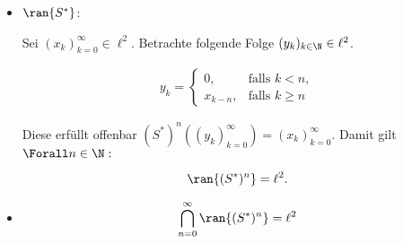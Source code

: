 \begin{solution}
\begin{itemize}

  \item
  $\ran{S^\ast}$:

  Sei $(x_k)_{k=0}^\infty \in \ell^2$.
  Betrachte folgende Folge $(y_k)_{k \in \N} \in \ell^2$.

  \begin{align*}
  y_k =
  \begin{cases}
    0,       & \text{falls~} k < n, \\
    x_{k-n}, & \text{falls~} k \geq n
  \end{cases}
  \end{align*}

  Diese erfüllt offenbar $(S^\ast)^n ((y_k)_{k=0}^\infty) = (x_k)_{k=0}^\infty$.
  Damit gilt $\Forall n \in \N:$

  \begin{align*}
    \ran{(S^\ast)^n}
    =
    \ell^2.
  \end{align*}

  \item
  \begin{align*}
    \bigcap_{n=0}^\infty
    \ran{(S^\ast)^n}
    =
    \ell^2
  \end{align*}

\end{itemize}

\end{solution}
